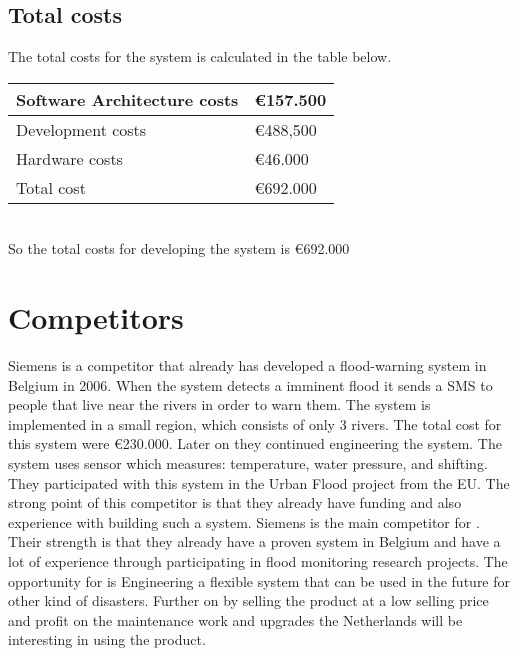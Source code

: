 \subsection{Total costs}
The total costs for the system is calculated in the table below.\\
\newline
\begin{tabular}{|L{}|L{}|}
	\toprule
	Software Architecture costs & \euro{}157.500\\ \midrule
	Development costs & \euro{}{}488,500\\ \midrule
	Hardware costs & \euro{}46.000\\ \midrule
	Total cost & \euro{}692.000\\
	\bottomrule
\end{tabular}\\
So the total costs for developing the system is \euro{}692.000\\

\section{Competitors}
Siemens is a competitor that already has developed a flood-warning system in Belgium in 2006. When the system detects a imminent flood it sends a SMS to people that live near the rivers in order to warn them. The system is implemented in a small region, which consists of only 3 rivers. The total cost for this system were \euro{}230.000. Later on they continued engineering the system. The system uses sensor which measures: temperature, water pressure, and shifting. They participated with this system in the Urban Flood project from the EU. The strong point of this competitor is that they already have funding and also experience with building such a system. Siemens is the main competitor for \CompanyName{}. Their strength is that they already have a proven system in Belgium and have a lot of experience through participating in flood monitoring research projects. The opportunity for \CompanyName{} is Engineering a flexible system that can be used in the future for other kind of disasters. Further on by selling the product at a low selling price and profit on the maintenance work and upgrades the Netherlands will be interesting in using the product.


